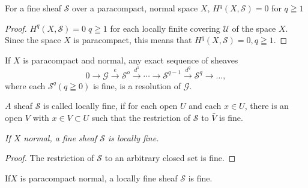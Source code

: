  \begin{proposition}\label{chap16:prop12}%
For a fine sheaf $\mathscr{S}$ over a paracompact, normal space
$X$, $H^q (X, \mathscr{S}) = 0$ for $q \geqq 1$ 
\end{proposition}

\begin{proof}
$H^q (X, \mathscr{S}) = 0 \;  q \geqq 1$ for each locally finite covering
  $\mathscr{U}$ of the space $X$. Since the space $X$ is paracompact,
  this means that $H^q (X, \mathscr{S}) = 0, q \geqq 1$.   
\end{proof}  

\begin{coro*}%
If $X$ is paracompact and normal, any exact sequence of sheaves  
$$
0 \to \mathscr{G} \xrightarrow{e} \mathscr{S}^o \xrightarrow{d^1}
\cdots \to \mathscr{S}^{q-1} \xrightarrow{d^q} \mathscr{S}^q \to
\ldots, 
$$
where each $\mathscr{S}^q (q \geqq 0)$ is fine, is a 
  resolution of $\mathscr{G}$. 
\end{coro*}

\begin{defi*}%
$A$ sheaf $ \mathscr{S}$ is called locally fine, if for each
  open $U$ and each $x \in U$, there is an open $V$ with $x
  \in V \subset U$ such that the restriction of $\mathscr{S}$
  to $\bar{V}$ is fine. 
\end{defi*}

\textit{If $X$ normal, a fine sheaf $\mathscr{S}$ is locally fine.} 

\begin{proof}
The restriction of $\mathscr{S}$ to an arbitrary closed set is fine. 
\end{proof}

\begin{proposition}\label{chap16:prop13}%
If\pageoriginale $X$ is paracompact normal, a locally fine sheaf
$\mathscr{S}$ is fine. 
\end{proposition}

